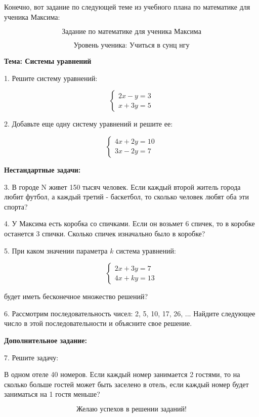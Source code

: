 \documentclass{article}
\begin{document}
Конечно, вот задание по следующей теме из учебного плана по математике для ученика Максима:

\[
\text{Задание по математике для ученика Максима}
\]

\[
\text{Уровень ученика: Учиться в сунц нгу}
\]

\textbf{Тема: Системы уравнений}

1. Решите систему уравнений:

\[
\begin{cases}
2x - y = 3 \\
x + 3y = 5
\end{cases}
\]

2. Добавьте еще одну систему уравнений и решите ее:

\[
\begin{cases}
4x + 2y = 10 \\
3x - 2y = 7
\end{cases}
\]

\textbf{Нестандартные задачи:}

3. В городе N живет 150 тысяч человек. Если каждый второй житель города любит футбол, а каждый третий - баскетбол, то сколько человек любят оба эти спорта?

4. У Максима есть коробка со спичками. Если он возьмет 6 спичек, то в коробке останется 3 спички. Сколько спичек изначально было в коробке?

5. При каком значении параметра \(k\) система уравнений:

\[
\begin{cases}
2x + 3y = 7 \\
4x + ky = 13
\end{cases}
\]

будет иметь бесконечное множество решений?

6. Рассмотрим последовательность чисел: 2, 5, 10, 17, 26, ... Найдите следующее число в этой последовательности и объясните свое решение.

\textbf{Дополнительное задание:}

7. Решите задачу:

В одном отеле 40 номеров. Если каждый номер занимается 2 гостями, то на сколько больше гостей может быть заселено в отель, если каждый номер будет заниматься на 1 гостя меньше?

\[
\text{Желаю успехов в решении заданий!}
\]
\end{document}
